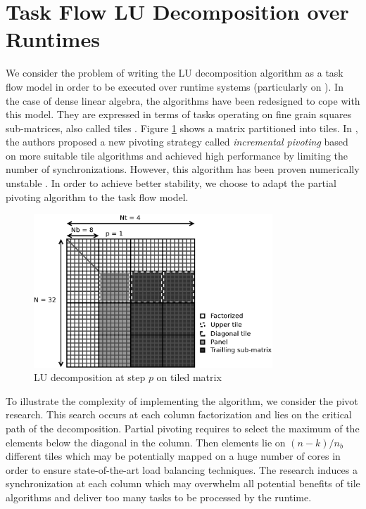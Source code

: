 \section{Task Flow LU Decomposition over Runtimes \label{task_flow_lu}}
We consider the problem of writing the LU decomposition algorithm as a task flow model in order to be executed over runtime systems (particularly on \dague). In the case of dense linear algebra, the algorithms have been redesigned to cope with this model. They are expressed in terms of tasks operating on fine grain squares sub-matrices, also called tiles \cite{conf/para/ButtariDKLLT06,ChanEtAl07b}. Figure \ref{fig:tiled_matrix} shows a matrix partitioned into tiles. In \cite{Buttari09}, the authors proposed a new pivoting strategy called \emph{incremental pivoting} based on \cite{Quintana-Orti:2009:ULF} more suitable tile algorithms and achieved high performance by limiting the number of synchronizations. However, this algorithm has been proven numerically unstable \cite{journals/siammax/GrigoriDX11}. In order to achieve better stability, we choose to adapt the partial pivoting algorithm to the task flow model.

\begin{figure}[!ht]
\centering
\includegraphics[width=0.8\textwidth]{figures/tiled_matrix.pdf}
\caption{LU decomposition at step $p$ on tiled matrix \label{fig:tiled_matrix}}
\end{figure}

To illustrate the complexity of implementing the algorithm, we consider the pivot research. This search occurs at each column factorization and lies on the critical path of the decomposition. Partial pivoting requires to select the maximum of the elements below the diagonal in the column. Then elements lie on $(n-k)/n_b$ different tiles which may be potentially mapped on a huge number of cores in order to ensure state-of-the-art load balancing techniques. The research induces a synchronization at each column which may overwhelm all potential benefits of tile algorithms and deliver too many tasks to be processed by the runtime.

